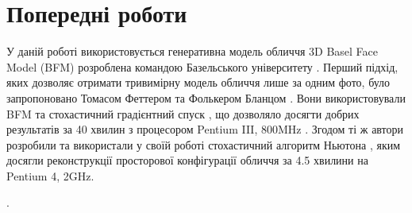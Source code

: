 \section{Попередні роботи}

У даній роботі використовується генеративна модель обличчя
3D Basel Face Model (BFM)
розроблена командою Базельського університету
\cite{bfm09}.
Перший підхід,
яких дозволяє отримати тривимірну модель обличчя лише за одним фото,
було запропоновано Томасом Феттером та Фолькером Бланцом
\cite{blanz:vetter:1999}.
Вони використовували BFM та стохастичний градієнтний спуск \cite{sgd:1998},
що дозволяло досягти добрих результатів за 40 хвилин з процесором
Pentium III, 800MHz \cite{blanz:romdhani:vetter}.
Згодом ті ж автори розробили та використали у своїй роботі
стохастичний алгоритм Ньютона \cite{blanz:vetter:2003},
яким досягли реконструкції просторової конфігурації обличчя за 4.5 хвилини на
Pentium 4, 2GHz.

\cite{tyshchenko2011}.
